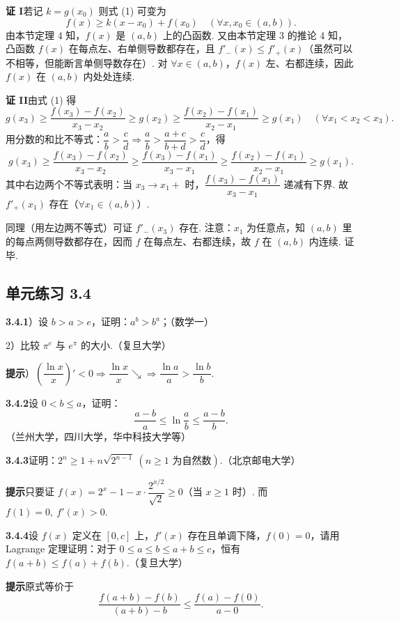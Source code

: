 \documentclass[UTF8, 12pt, fontset=fandol, oneside]{ctexart}
\begin{document}
\noindent\textbf{证 I}\quad 若记 $k=g(x_0)$ 则式 (1) 可变为
\[
  f(x)\ge k(x-x_0)+f(x_0)\quad(\forall x,x_0\in(a,b)).
\]
由本节定理 4 知，$f(x)$ 是 $(a,b)$ 上的凸函数. 又由本节定理 3 的推论 4 知，凸函数 $f(x)$ 在每点左、右单侧导数都存在，且 $f'_-(x)\le f'_+(x)$（虽然可以不相等，但能断言单侧导数存在）. 对 $\forall x\in(a,b)$，$f(x)$ 左、右都连续，因此 $f(x)$ 在 $(a,b)$ 内处处连续.

\noindent\textbf{证 II}\quad 由式 (1) 得
\[
  g(x_3)\ge \frac{f(x_3)-f(x_2)}{x_3-x_2}
  \ge g(x_2)\ge \frac{f(x_2)-f(x_1)}{x_2-x_1}
  \ge g(x_1)\quad(\forall x_1<x_2<x_3).
\]
用分数的和比不等式：$\dfrac ab>\dfrac cd\Rightarrow\dfrac ab>\dfrac{a+c}{b+d}>\dfrac cd$，得
\[
  g(x_3)\ge \frac{f(x_3)-f(x_2)}{x_3-x_2}
  \ge \frac{f(x_3)-f(x_1)}{x_3-x_1}
  \ge \frac{f(x_2)-f(x_1)}{x_2-x_1}
  \ge g(x_1).
\]
其中右边两个不等式表明：当 $x_3\to x_1+$ 时，$\dfrac{f(x_3)-f(x_1)}{x_3-x_1}$ 递减有下界. 故 $f'_+(x_1)$ 存在（$\forall x_1\in(a,b)$）.

同理（用左边两不等式）可证 $f'_-(x_3)$ 存在. 注意：$x_1$ 为任意点，知 $(a,b)$ 里的每点两侧导数都存在，因而 $f$ 在每点左、右都连续，故 $f$ 在 $(a,b)$ 内连续. 证毕.

\subsection*{单元练习 3.4}

\noindent\textbf{3.4.1}）设 $b>a>e$，证明：$a^b>b^a$；（数学一）

2）比较 $\pi^e$ 与 $e^\pi$ 的大小.（复旦大学）

\noindent\textbf{提示}）$\left(\dfrac{\ln x}{x}\right)'<0\Rightarrow\dfrac{\ln x}{x}\searrow\Rightarrow\dfrac{\ln a}{a}>\dfrac{\ln b}{b}$.

\noindent\textbf{3.4.2}\quad 设 $0<b\le a$，证明：
\[
  \frac{a-b}{a}\le\ln\frac ab\le\frac{a-b}{b}.
\]
（兰州大学，四川大学，华中科技大学等）

\noindent\textbf{3.4.3}\quad 证明：$2^n\ge1+n\sqrt{2^{n-1}}\ (n\ge1\text{ 为自然数})$.（北京邮电大学）

\noindent\textbf{提示}\quad 只要证 $f(x)=2^x-1-x\cdot\dfrac{2^{x/2}}{\sqrt2}\ge0$（当 $x\ge1$ 时）. 而 $f(1)=0,\ f'(x)>0$.

\noindent\textbf{3.4.4}\quad 设 $f(x)$ 定义在 $[0,c]$ 上，$f'(x)$ 存在且单调下降，$f(0)=0$，请用 Lagrange 定理证明：对于 $0\le a\le b\le a+b\le c$，恒有 $f(a+b)\le f(a)+f(b)$.（复旦大学）

\noindent\textbf{提示}\quad 原式等价于
\[
  \frac{f(a+b)-f(b)}{(a+b)-b}\le\frac{f(a)-f(0)}{a-0}.
\]
\end{document}
